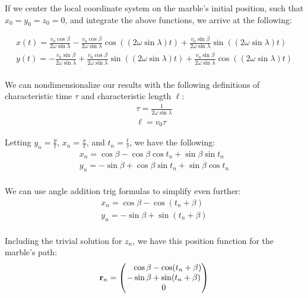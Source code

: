 \documentclass{article}
\begin{document}
If we center the local coordinate system on the marble's initial position, such that $x_0 = y_0 = z_0 = 0$, and integrate the above functions, we arrive at the following:

\begin{equation}
\begin{gathered}
x(t) = \frac{v_0\cos\beta}{2\omega\sin\lambda} - \frac{v_0\cos\beta}{2\omega\sin\lambda}\cos((2\omega\sin\lambda)t) + \frac{v_0\sin\beta}{2\omega\sin\lambda}\sin((2\omega\sin\lambda)t) \\
y(t) = -\frac{v_0\sin\beta}{2\omega\sin\lambda} + \frac{v_0\cos\beta}{2\omega\sin\lambda}\sin((2\omega\sin\lambda)t) + \frac{v_0\sin\beta}{2\omega\sin\lambda}\cos((2\omega\sin\lambda)t) \\
\end{gathered}
\end{equation}

We can nondimensionalize our results with the following definitions of characteristic time $\tau$ and characteristic length $\ell$:
\begin{equation}
\begin{gathered}
\tau = \frac{1}{2\omega\sin\lambda} \\
\ell = v_0\tau
\end{gathered}
\end{equation}

Letting $y_n = \frac{y}{\ell}$, $x_n = \frac{x}{\ell}$, and $t_n = \frac{t}{\tau}$, we have the following:
\begin{equation*}
\begin{gathered}
x_n = \cos\beta - \cos\beta\cos t_n + \sin\beta\sin t_n \\
y_n = -\sin\beta + \cos\beta\sin t_n + \sin\beta\cos t_n \\
\end{gathered}
\end{equation*}

We can use angle addition trig formulas to simplify even further:
\begin{equation}
\begin{gathered}
x_n = \cos\beta - \cos(t_n + \beta) \\
y_n = -\sin\beta + \sin(t_n + \beta) \\
\end{gathered}
\end{equation}

Including the trivial solution for $z_n$, we have this position function for the marble's path:
\begin{equation}
\vb{r}_n =
\begin{pmatrix}
 \phantom{-}\cos\beta - \cos(t_n + \beta) \\
 -\sin\beta + \sin(t_n + \beta) \\
 0
 \end{pmatrix}
\end{equation}
\end{document}
